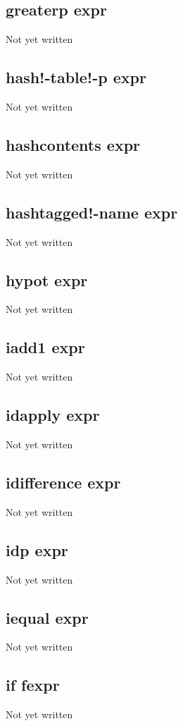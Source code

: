 \documentclass[a4paper,11pt]{article}
\begin{document}
{\subsection{\ttfamily greaterp expr}
Not yet written

\subsection{\ttfamily hash!-table!-p expr}
Not yet written

\subsection{\ttfamily hashcontents expr}
Not yet written

\subsection{\ttfamily hashtagged!-name expr}
Not yet written

\subsection{\ttfamily hypot expr}
Not yet written

\subsection{\ttfamily iadd1 expr}
Not yet written

\subsection{\ttfamily idapply expr}
Not yet written

\subsection{\ttfamily idifference expr}
Not yet written

\subsection{\ttfamily idp expr}
Not yet written

\subsection{\ttfamily iequal expr}
Not yet written

\subsection{\ttfamily if fexpr}
Not yet written

}
\end{document}
